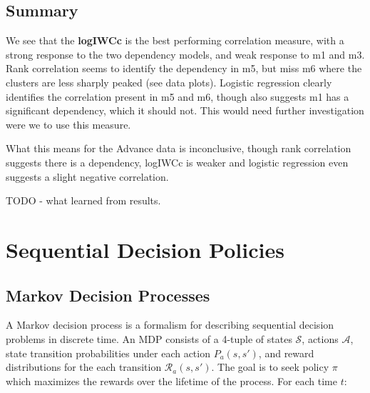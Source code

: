 \documentclass[11pt,a4,singlespacing,titlepagenumber=on]{scrreprt}
\numberwithin{equation}{chapter} %
\theoremstyle{remark}
\begin{document}
\section{Summary}

We see that the \textbf{logIWCc} is the best performing correlation measure, with a strong response to the two dependency models, and weak response to m1 and m3. Rank correlation seems to identify the dependency in m5, but miss m6 where the clusters are less sharply peaked (see data plots). Logistic regression clearly identifies the correlation present in m5 and m6, though also suggests m1 has a significant dependency, which it should not. This would need further investigation were we to use this measure.

What this means for the Advance data is inconclusive, though rank correlation suggests there is a dependency, logIWCc is weaker and logistic regression even suggests a slight negative correlation.


TODO - what learned from results.

%

\chapter{ Sequential Decision Policies }

\section{ Markov Decision Processes }

A Markov decision process is a formalism for describing sequential decision problems in discrete time. An MDP consists of a 4-tuple of states $\mathcal{S}$, actions $\mathcal{A}$, state transition probabilities under each action $P_a(s,s')$, and reward distributions for the each transition $\mathcal{R}_a(s,s')$. The goal is to seek policy $\pi$ which maximizes the rewards over the lifetime of the process. For each time $t$:
\end{document}
